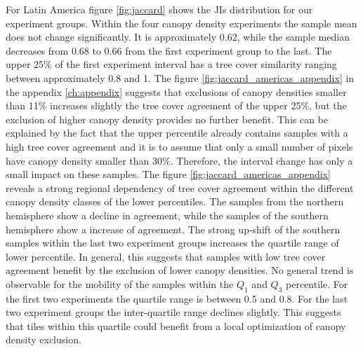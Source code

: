 			For Latin America figure \ref{fig:jaccard} shows the \acp{JI} distribution for our experiment groups. Within the four canopy density experiments the sample mean does not change significantly. It is approximately 0.62, while the sample median decreases from 0.68 to 0.66 from the first experiment group to the last. The upper 25\% of the first experiment interval has a tree cover similarity ranging between approximately 0.8 and 1. The figure \ref{fig:jaccard_americas_appendix} in the appendix \ref{ch:appendix} suggests that exclusions of canopy densities smaller than 11\% increases slightly the tree cover agreement of the upper 25\%, but the exclusion of higher canopy density provides no further benefit. This can be explained by the fact that the upper percentile already contains samples with a high tree cover agreement and it is to assume that only a small number of pixels have canopy density smaller than 30\%. Therefore, the interval change has only a small impact on these samples. The figure \ref{fig:jaccard_americas_appendix} reveals a strong regional dependency of tree cover agreement within the different canopy density classes of the lower percentiles. The samples from the northern hemisphere show a decline in agreement, while the samples of the southern hemisphere show a increase of agreement. The strong up-shift of the southern samples within the last two experiment groups increases the quartile range of lower percentile. In general, this suggests that samples with low tree cover agreement benefit by the exclusion of lower canopy densities. No general trend is observable for the mobility of the samples within the $Q_1$ and $Q_3$ percentile. For the first two experiments the quartile range is between 0.5 and 0.8. For the last two experiment groups the inter-quartile range declines slightly. This suggests that tiles within this quartile could benefit from a local optimization of canopy density exclusion. 

